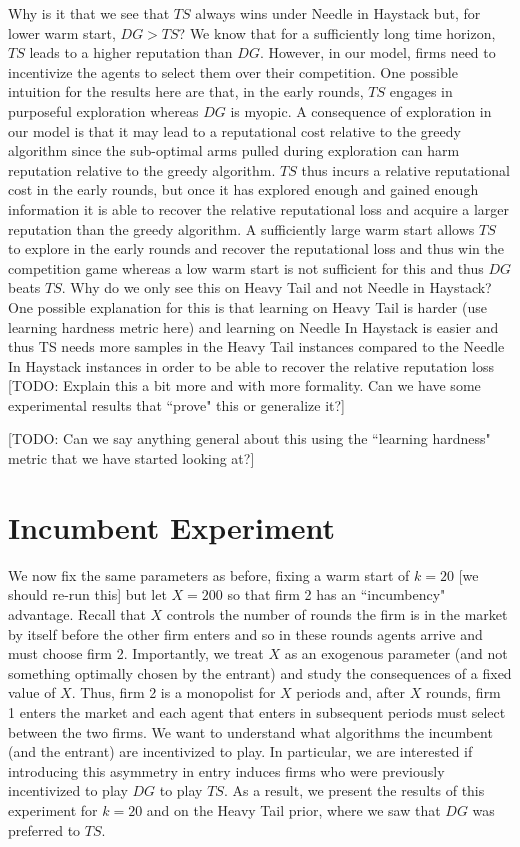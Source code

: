 \documentclass{article}
\theoremstyle{definition}
\begin{document}
Why is it that we see that $TS$ always wins under Needle in Haystack but, for lower warm start, $DG > TS$? We know that for a sufficiently long time horizon, $TS$ leads to a higher reputation than $DG$. However, in our model, firms need to incentivize the agents to select them over their competition. One possible intuition for the results here are that, in the early rounds, $TS$ engages in purposeful exploration whereas $DG$ is myopic. A consequence of exploration in our model is that it may lead to a reputational cost relative to the greedy algorithm since the sub-optimal arms pulled during exploration can harm reputation relative to the greedy algorithm. $TS$ thus incurs a relative reputational cost in the early rounds, but once it has explored enough and gained enough information it is able to recover the relative reputational loss and acquire a larger reputation than the greedy algorithm. A sufficiently large warm start allows $TS$ to explore in the early rounds and recover the reputational loss and thus win the competition game whereas a low warm start is not sufficient for this and thus $DG$ beats $TS$. Why do we only see this on Heavy Tail and not Needle in Haystack? One possible explanation for this is that learning on Heavy Tail is harder (use learning hardness metric here) and learning on Needle In Haystack is easier and thus TS needs more samples in the Heavy Tail instances compared to the Needle In Haystack instances in order to be able to recover the relative reputation loss [TODO: Explain this a bit more and with more formality. Can we have some experimental results that ``prove" this or generalize it?]

[TODO: Can we say anything general about this using the ``learning hardness" metric that we have started looking at?]

\section{Incumbent Experiment}
\label{S:7}

We now fix the same parameters as before, fixing a warm start of $k = 20$ [we should re-run this] but let $X = 200$ so that firm 2 has an ``incumbency" advantage. Recall that $X$ controls the number of rounds the firm is in the market by itself before the other firm enters and so in these rounds agents arrive and must choose firm 2. Importantly, we treat $X$ as an exogenous parameter (and not something optimally chosen by the entrant) and study the consequences of a fixed value of $X$. Thus, firm 2 is a monopolist for $X$ periods and, after $X$ rounds, firm 1 enters the market and each agent that enters in subsequent periods must select between the two firms. We want to understand what algorithms the incumbent (and the entrant) are incentivized to play. In particular, we are interested if introducing this asymmetry in entry induces firms who were previously incentivized to play $DG$ to play $TS$. As a result, we present the results of this experiment for $k = 20$ and on the Heavy Tail prior, where we saw that $DG$ was preferred to $TS$.
\end{document}
